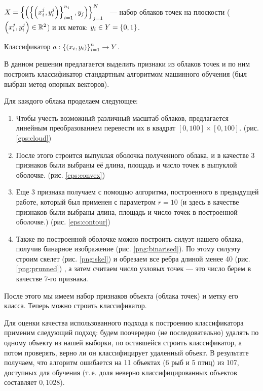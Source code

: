 






 $X = \left\{
                          \left(
                              \left\{\left(x_i^j, y_i^j\right)\right\}_{i=1}^{n_i}, y_j
                          \right)
                      \right\}_{j=1}^N$ ~--- набор облаков точек на плоскости ($\left(x_i^j, y_i^j\right) \in \mathbb R^2$) и их меток: $y_i\in Y=\left\{0,1\right\}$.

 Классификатор $a: \left\{\left(x_i, y_i\right)\right\}_{i=1}^n \to Y$.

В данном решении предлагается выделить признаки из облаков точек и по ним построить классификатор стандартным алгоритмом машинного обучения (был выбран метод опорных векторов).

Для каждого облака проделаем следующее:
\begin{enumerate}
  \item Чтобы учесть возможный различный масштаб облаков, предлагается линейным преобразованием перевести их в квадрат $[0, 100]\times [0, 100].$ (рис. \ref{eps:cloud})
  \item После этого  строится выпуклая оболочка полученного облака, и в качестве 3 признаков были выбраны её длина, площадь и число точек в выпуклой оболочке. (рис. \ref{eps:convex})
  \item Еще 3 признака получаем с помощью алгоритма, построенного в предыдущей работе, который был применен с параметром $r = 10$ (и здесь в качестве признаков были выбраны длина, площадь и число точек в построенной оболочке.) (рис. \ref{eps:contour})
  \item Также по построенной оболочке можно построить силуэт нашего облака, получив бинарное изображение (рис. \ref{png:binarised}). По этому силуэту строим скелет (рис. \ref{png:skel}) и обрезаем все ребра длиной менее 40 (рис. \ref{png:prunned}) , а затем считаем число узловых точек --- это число берем в качестве 7-го признака. 
\end{enumerate}
После этого мы имеем набор признаков объекта (облака точек) и метку его класса. Теперь можно строить классификатор. 

Для оценки качества использованного подхода к построению классификатора применим следующий подход: будем поочередно (не последовательно) удалять по одному объекту из нашей выборки, по оставшейся строить классификатор, а потом проверять, верно ли он классифицирует удаленный объект.
В результате получаем, что алгоритм ошибается на 11 объектах (6 рыб и 5 птиц) из 107, доступных для обучения (т.\,е. доля неверно классифицированных объектов составляет $0{,}1028$).



